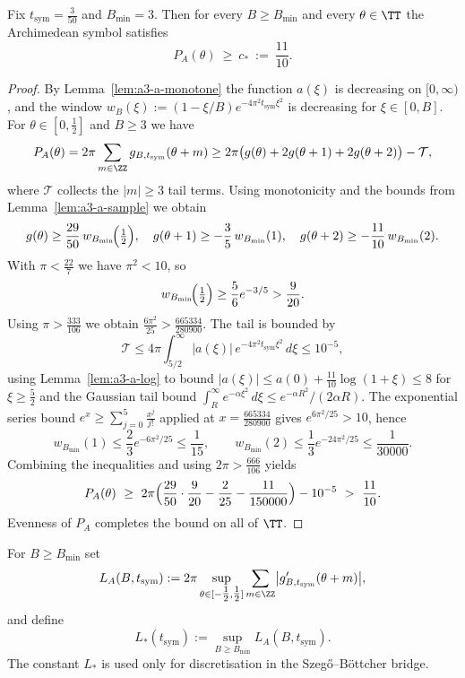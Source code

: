 \begin{lemma}\label{lem:uniform-arch-floor}
Fix $t_{\mathrm{sym}}=\frac{3}{50}$ and $B_{\min}=3$. Then for every $B\ge B_{\min}$ and every
$\theta\in\TT$ the Archimedean symbol satisfies
\[
  P_A(\theta)\ \ge\ c_*\ :=\ \frac{11}{10}.
\]
\end{lemma}
\begin{proof}
By Lemma~\ref{lem:a3-a-monotone} the function $a(\xi)$ is decreasing on $[0,\infty)$, and the window
\(
  w_B(\xi):=(1-\xi/B)e^{-4\pi^2 t_{\mathrm{sym}}\xi^2}
\)
is decreasing for $\xi\in[0,B]$.  For $\theta\in[0,\tfrac12]$ and $B\ge3$ we have
\[
  P_A(\theta)=2\pi\sum_{m\in\ZZ} g_{B,t_{\mathrm{sym}}}(\theta+m)
  \ge 2\pi\bigl(g(\theta)+2g(\theta+1)+2g(\theta+2)\bigr) - \mathcal T,
\]
where $\mathcal T$ collects the $|m|\ge3$ tail terms.  Using monotonicity and the bounds
from Lemma~\ref{lem:a3-a-sample} we obtain
\[
  g(\theta)\ge \frac{29}{50}\,w_{B_{\min}}\!\Bigl(\tfrac12\Bigr),\quad
  g(\theta+1)\ge -\frac{3}{5}\,w_{B_{\min}}(1),\quad
  g(\theta+2)\ge -\frac{11}{10}\,w_{B_{\min}}(2).
\]
With $\pi<\tfrac{22}{7}$ we have $\pi^2<10$, so
\[
  w_{B_{\min}}\!\Bigl(\tfrac12\Bigr)
  \ge \frac{5}{6}e^{-3/5}
  >\frac{9}{20}.
\]
Using $\pi>\tfrac{333}{106}$ we obtain
\(
  \frac{6\pi^2}{25}>\frac{665334}{280900}.
\)
The tail is bounded by
\[
  \mathcal T \le 4\pi\int_{5/2}^{\infty}\!|a(\xi)|\,e^{-4\pi^2 t_{\mathrm{sym}}\xi^2}\,d\xi
  \le 10^{-5},
\]
using Lemma~\ref{lem:a3-a-log} to bound $|a(\xi)|\le a(0)+\tfrac{11}{10}\log(1+\xi)\le 8$ for $\xi\ge\tfrac52$
and the Gaussian tail bound $\int_{R}^{\infty}e^{-\alpha \xi^2}\,d\xi\le e^{-\alpha R^2}/(2\alpha R)$.
The exponential series bound
\(
  e^{x}\ge \sum_{j=0}^{5}\frac{x^j}{j!}
\)
applied at \(x=\frac{665334}{280900}\) gives \(e^{6\pi^2/25}>10\), hence
\[
  w_{B_{\min}}(1)\le \frac{2}{3}e^{-6\pi^2/25}\le \frac{1}{15},\qquad
  w_{B_{\min}}(2)\le \frac{1}{3}e^{-24\pi^2/25}\le \frac{1}{30000}.
\]
Combining the inequalities and using \(2\pi>\tfrac{666}{106}\) yields
\[
  P_A(\theta)\ \ge\ 2\pi\Bigl(\frac{29}{50}\cdot\frac{9}{20}-\frac{2}{25}-\frac{11}{150000}\Bigr)-10^{-5}
  \ >\ \frac{11}{10}.
\]
Evenness of $P_A$ completes the bound on all of $\TT$.
\end{proof}

\begin{definition}\label{def:uniform-L}
For $B\ge B_{\min}$ set
\[
  L_A(B,t_{\mathrm{sym}})
  := 2\pi\sup_{\theta\in[-\tfrac12,\tfrac12]}
      \sum_{m\in\ZZ}\bigl|g_{B,t_{\mathrm{sym}}}'(\theta+m)\bigr|,
\]
and define
\[
  L_*(t_{\mathrm{sym}}) := \sup_{B\ge B_{\min}}L_A(B,t_{\mathrm{sym}}).
\]
The constant $L_*$ is used only for discretisation in the Szeg\H{o}--B\"ottcher bridge.
\end{definition}

